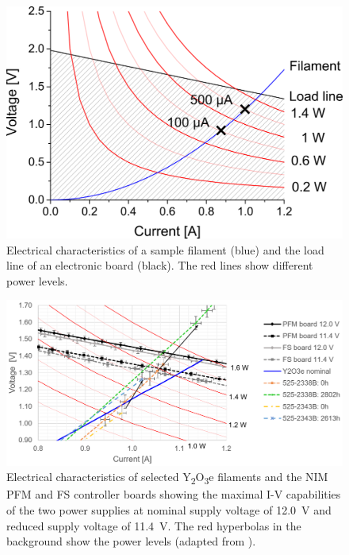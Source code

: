 		
		
		\begin{figure}[h]
			\centering
			\includegraphics[width=.7\textwidth]{Bilder/Fil_SampGraph.png}
			\caption{Electrical characteristics of a sample filament (blue) and the load line of an electronic board (black). The red lines show different power levels.}
			\label{fig:FilSampGraph}
		\end{figure}
		\begin{figure}[h]
			\centering
			\includegraphics[width=\textwidth]{Bilder/Filament_RicosGraph.png}
			\caption{Electrical characteristics of selected Y\textsubscript{2}O\textsubscript{3}e filaments and the NIM PFM and FS controller boards showing the maximal I-V capabilities of the two power supplies at nominal supply voltage of 12.0~V and reduced supply voltage of 11.4~V. The red hyperbolas in the background show the power levels (adapted from \cite{Diss_Fausch}).}
			\label{fig:FilRico}
		\end{figure}
		
